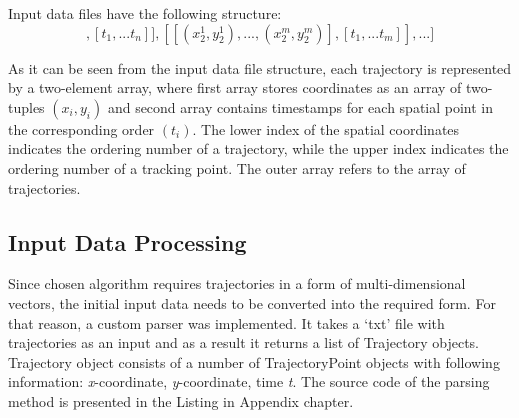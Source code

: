 Input data files have the following structure:
\begin{equation}
	[[[(x_1^1, y_1^1), ..., (x_1^n, y_1^n)], [t_1, ... t_n]], [[(x_2^1, y_2^1), ..., (x_2^m, y_2^m)], [t_1, ... t_m]], ...]
\end{equation}

As it can be seen from the input data file structure, each trajectory is represented by a two-element array, where first array stores coordinates as an array of two-tuples $(x_i, y_i)$ and second array contains timestamps for each spatial point in the corresponding order $(t_i)$. The lower index of the spatial coordinates indicates the ordering number of a trajectory, while the upper index indicates the ordering number of a tracking point. The outer array refers to the array of trajectories.


\subsection{Input Data Processing}
Since chosen algorithm requires trajectories in a form of multi-dimensional vectors, the initial input data needs to be converted into the required form. For that reason, a custom parser was implemented. It takes a ‘txt’ file with trajectories as an input and as a result it returns a list of Trajectory objects. Trajectory object consists of a number of TrajectoryPoint objects with following information: \textit{x}-coordinate, \textit{y}-coordinate, time \textit{t}. The source code of the parsing method is presented in the Listing in Appendix chapter.